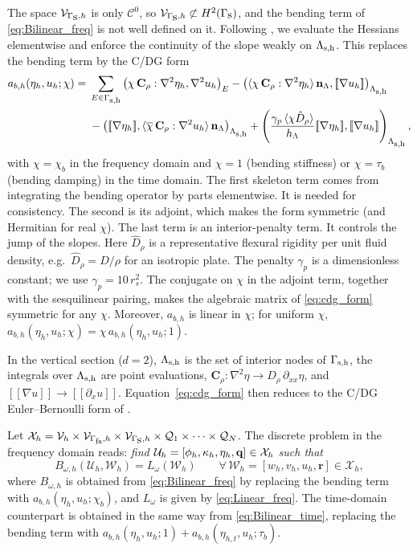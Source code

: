 The space $\mathcal{V}_{\Gamma_{\mbox{s}},h}$ is only $\mathcal{C}^0$, so $\mathcal{V}_{\Gamma_{\mbox{s}},h}\not\subset H^2(\Gamma_{\mbox{s}})$, and the bending term of \eqref{eq:Bilinear_freq} is not well defined on it. Following \cite{engel2002continuous,colomes2023monolithic}, we evaluate the Hessians elementwise and enforce the continuity of the slope weakly on $\Lambda_{\mbox{\scriptsize s,h}}$. This replaces the bending term by the C/DG form
\begin{align}\label{eq:cdg_form}
    a_{b,h}(\eta_h,u_h;\chi) ={}&
    \sum_{E\in\Gmh}\left(\chi\,\mathbf{C}_\rho:\nabla^2\eta_h,\nabla^2u_h\right)_E
    -\left(\langle\chi\,\mathbf{C}_\rho:\nabla^2\eta_h\rangle\,\nvec_\Lambda,[\![\nabla u_h]\!]\right)_{\Lmh}\\\nonumber
    &-\left([\![\nabla\eta_h]\!],\langle\overline{\chi}\,\mathbf{C}_\rho:\nabla^2u_h\rangle\,\nvec_\Lambda\right)_{\Lmh}
    +\left(\frac{\gamma_p\,\langle\chi \hat D_\rho\rangle}{h_\Lambda}[\![\nabla\eta_h]\!],[\![\nabla u_h]\!]\right)_{\Lmh},
\end{align}
with $\chi=\chi_b$ in the frequency domain and $\chi=1$ (bending stiffness) or $\chi=\tau_b$ (bending damping) in the time domain. The first skeleton term comes from integrating the bending operator by parts elementwise. It is needed for consistency. The second is its adjoint, which makes the form symmetric (and Hermitian for real $\chi$). The last term is an interior-penalty term. It controls the jump of the slopes.
%
Here $\hat D_\rho$ is a representative flexural rigidity per unit fluid density, e.g.\ $\hat D_\rho=D/\rho$ for an isotropic plate. The penalty $\gamma_p$ is a dimensionless constant; we use $\gamma_p=10\,r_s^2$. The conjugate on $\chi$ in the adjoint term, together with the sesquilinear pairing, makes the algebraic matrix of \eqref{eq:cdg_form} symmetric for any $\chi$. Moreover, $a_{b,h}$ is linear in $\chi$; for uniform $\chi$, $a_{b,h}(\eta_h,u_h;\chi)=\chi\,a_{b,h}(\eta_h,u_h;1)$.

In the vertical section ($d=2$), $\Lambda_{\mbox{\scriptsize s,h}}$ is the set of interior nodes of $\Gamma_{\mbox{\scriptsize s,h}}$, the integrals over $\Lambda_{\mbox{\scriptsize s,h}}$ are point evaluations, $\mathbf{C}_\rho:\nabla^2\eta\to D_\rho\,\partial_{xx}\eta$, and $[\![\nabla u]\!]\to[\![\partial_x u]\!]$. Equation~\eqref{eq:cdg_form} then reduces to the C/DG Euler--Bernoulli form of \cite[Appendix~A]{colomes2023monolithic}.

Let $\mathcal{X}_h=\mathcal{V}_h\times\mathcal{V}_{\Gamma_{\mbox{\scriptsize fs}},h}\times\mathcal{V}_{\Gamma_{\mbox{s}},h}\times\mathcal{Q}_1\times\cdots\times\mathcal{Q}_N$. The discrete problem in the frequency domain reads: \textit{find $\mathcal{U}_h=[\phi_h,\kappa_h,\eta_h,\mathbf{q}]\in\mathcal{X}_h$ such that}
\begin{equation}\label{eq:discreteform_freq}
    B_{\omega,h}(\mathcal{U}_h,\mathcal{W}_h) = L_\omega(\mathcal{W}_h)\qquad\forall\,\mathcal{W}_h=[w_h,v_h,u_h,\mathbf{r}]\in\mathcal{X}_h,
\end{equation}
where $B_{\omega,h}$ is obtained from \eqref{eq:Bilinear_freq} by replacing the bending term with $a_{b,h}(\eta_h,u_h;\chi_b)$, and $L_\omega$ is given by \eqref{eq:Linear_freq}. The time-domain counterpart is obtained in the same way from \eqref{eq:Bilinear_time}, replacing the bending term with $a_{b,h}(\eta_h,u_h;1)+a_{b,h}(\eta_{h,t},u_h;\tau_b)$.

